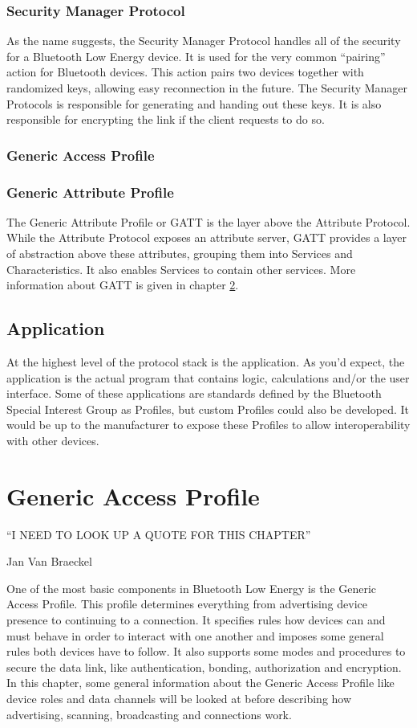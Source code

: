 \documentclass[pdftex,a4paper,12pt,twoside]{report}
\begin{document}
\subsection{Security Manager Protocol}
\label{subsec:hostSMP}
As the name suggests, the Security Manager Protocol handles all of the security for a Bluetooth Low Energy device. It is used for the very common ``pairing'' action for Bluetooth devices. This action pairs two devices together with randomized keys, allowing easy reconnection in the future. The Security Manager Protocols is responsible for generating and handing out these keys. It is also responsible for encrypting the link if the client requests to do so.

\subsection{Generic Access Profile}
\label{subsec:hostGAP}


\subsection{Generic Attribute Profile}
\label{subsec:hostGATT}
The Generic Attribute Profile or GATT is the layer above the Attribute Protocol. While the Attribute Protocol exposes an attribute server, GATT provides a layer of abstraction above these attributes, grouping them into Services and Characteristics. It also enables Services to contain other services. More information about GATT is given in chapter \ref{ch:gap}.

\section{Application}
\label{sec:stackApplication}
At the highest level of the protocol stack is the application. As you'd expect, the application is the actual program that contains logic, calculations and/or the user interface. Some of these applications are standards defined by the Bluetooth Special Interest Group as Profiles, but custom Profiles could also be developed. It would be up to the manufacturer to expose these Profiles to allow interoperability with other devices.

\chapter{Generic Access Profile}
\label{ch:gap}
\epigraph{``I NEED TO LOOK UP A QUOTE FOR THIS CHAPTER''}{Jan Van Braeckel}
One of the most basic components in Bluetooth Low Energy is the Generic Access Profile. This profile determines everything from advertising device presence to continuing to a connection. It specifies rules how devices can and must behave in order to interact with one another and imposes some general rules both devices have to follow. It also supports some modes and procedures to secure the data link, like authentication, bonding, authorization and encryption. In this chapter, some general information about the Generic Access Profile like device roles and data channels will be looked at before describing how advertising, scanning, broadcasting and connections work.
\end{document}
